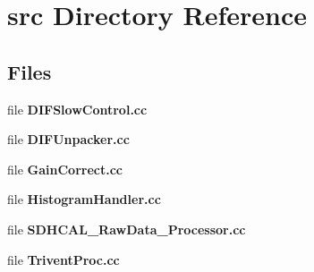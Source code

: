 \section{src Directory Reference}
\label{dir_c35022d707df707fac4f019dcec2e375}
\subsection*{Files}
\begin{DoxyCompactItemize}
\item 
file {\bfseries D\-I\-F\-Slow\-Control.\-cc}
\item 
file {\bfseries D\-I\-F\-Unpacker.\-cc}
\item 
file {\bfseries Gain\-Correct.\-cc}
\item 
file {\bfseries Histogram\-Handler.\-cc}
\item 
file {\bfseries S\-D\-H\-C\-A\-L\-\_\-\-Raw\-Data\-\_\-\-Processor.\-cc}
\item 
file {\bfseries Trivent\-Proc.\-cc}
\end{DoxyCompactItemize}
